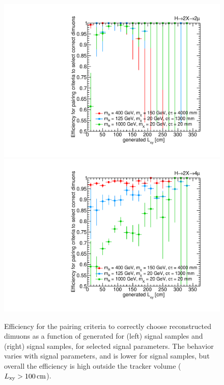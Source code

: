 \begin{figure}[p]
  \centering
  \includegraphics[width=\DSquareWidth]{figures/displaced/PC_Lxy_2Mu2J_Mul.pdf}
  \hspace*{-2em}
  \includegraphics[width=\DSquareWidth]{figures/displaced/PC_Lxy_4Mu_Mul.pdf}
  \caption{Efficiency for the pairing criteria to correctly choose reconstructed dimuons as a function of generated \Lxy for (left) \twoMu signal samples and (right) \fourMu signal samples, for selected signal parameters. The behavior varies with signal parameters, and is lower for \fourMu signal samples, but overall the efficiency is high outside the tracker volume ($L_{\mathrm{xy}} > 100\,\text{cm}$).}
  \label{fig:dd:PC_Eff}
\end{figure}
